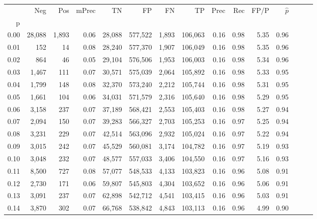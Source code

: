 \begin{tabular}{rrrrrrrrrrrrrrr}
\toprule
{} &     Neg &    Pos & mPrec &       TN &       FP &       FN &       TP &  Prec &   Rec &  FP/P & $\hat{p}$ \\
p    &         &        &       &          &          &          &          &       &       &       &           \\
\midrule
0.00 &  28,088 &  1,893 &  0.06 &   28,088 &  577,522 &    1,893 &  106,063 &  0.16 &  0.98 &  5.35 &      0.96 \\
0.01 &     152 &     14 &  0.08 &   28,240 &  577,370 &    1,907 &  106,049 &  0.16 &  0.98 &  5.35 &      0.96 \\
0.02 &     864 &     46 &  0.05 &   29,104 &  576,506 &    1,953 &  106,003 &  0.16 &  0.98 &  5.34 &      0.96 \\
0.03 &   1,467 &    111 &  0.07 &   30,571 &  575,039 &    2,064 &  105,892 &  0.16 &  0.98 &  5.33 &      0.95 \\
0.04 &   1,799 &    148 &  0.08 &   32,370 &  573,240 &    2,212 &  105,744 &  0.16 &  0.98 &  5.31 &      0.95 \\
0.05 &   1,661 &    104 &  0.06 &   34,031 &  571,579 &    2,316 &  105,640 &  0.16 &  0.98 &  5.29 &      0.95 \\
0.06 &   3,158 &    237 &  0.07 &   37,189 &  568,421 &    2,553 &  105,403 &  0.16 &  0.98 &  5.27 &      0.94 \\
0.07 &   2,094 &    150 &  0.07 &   39,283 &  566,327 &    2,703 &  105,253 &  0.16 &  0.97 &  5.25 &      0.94 \\
0.08 &   3,231 &    229 &  0.07 &   42,514 &  563,096 &    2,932 &  105,024 &  0.16 &  0.97 &  5.22 &      0.94 \\
0.09 &   3,015 &    242 &  0.07 &   45,529 &  560,081 &    3,174 &  104,782 &  0.16 &  0.97 &  5.19 &      0.93 \\
0.10 &   3,048 &    232 &  0.07 &   48,577 &  557,033 &    3,406 &  104,550 &  0.16 &  0.97 &  5.16 &      0.93 \\
0.11 &   8,500 &    727 &  0.08 &   57,077 &  548,533 &    4,133 &  103,823 &  0.16 &  0.96 &  5.08 &      0.91 \\
0.12 &   2,730 &    171 &  0.06 &   59,807 &  545,803 &    4,304 &  103,652 &  0.16 &  0.96 &  5.06 &      0.91 \\
0.13 &   3,091 &    237 &  0.07 &   62,898 &  542,712 &    4,541 &  103,415 &  0.16 &  0.96 &  5.03 &      0.91 \\
0.14 &   3,870 &    302 &  0.07 &   66,768 &  538,842 &    4,843 &  103,113 &  0.16 &  0.96 &  4.99 &      0.90 \\

\end{tabular}
